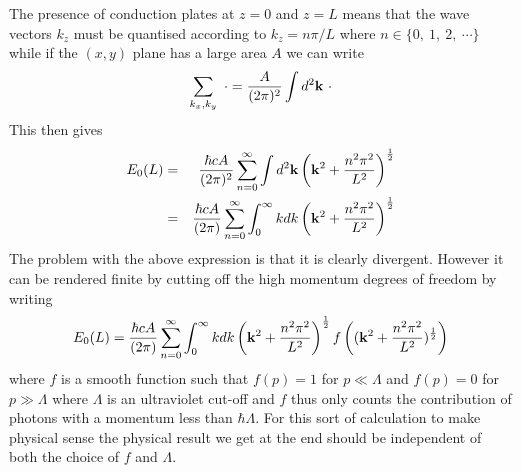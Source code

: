 The presence of conduction plates at $z=0$ and $z=L$ means that the wave vectors $k_z$
must be quantised according to $k_z= n\pi/L$ where $n \in \{0,\ 1, \ 2, \ \cdots\}$ while
if the $(x,y)$ plane has a large area $A$ we can write
\begin{equation}
    \sum_{k_x,k_y}\ \cdot= {A\over (2\pi)^2}\int  d^2{\bf k} \ \cdot
\end{equation}
This then gives 
\begin{eqnarray}
E_0(L) &=& {\hbar c A\over (2\pi)^2}\sum_{n=0}^\infty  \int  d^2{\bf k} \left({\bf k}^2 + {n^2\pi^2\over L^2}\right)^{1\over 2} \\
&=& {\hbar c A\over (2\pi)}\sum_{n=0}^\infty  \int_0^\infty  kdk \left({\bf k}^2 + {n^2\pi^2\over L^2}\right)^{1\over 2}
\end{eqnarray}
The problem with the above expression is that it is clearly divergent. However it can be rendered finite by cutting off the high momentum degrees of freedom by writing
\begin{equation}
    E_0(L) = {\hbar c A\over (2\pi)}\sum_{n=0}^\infty  \int_0^\infty  kdk \left({\bf k}^2 + {n^2\pi^2\over L^2}\right)^{1\over 2} f\left(({\bf k}^2 + {n^2\pi^2\over L^2})^{1\over 2}\right)
\end{equation}
where $f$ is a smooth function such that $f(p)=1$ for $p\ll\Lambda$ and $f(p)=0$ for $p\gg\Lambda$ where $\Lambda$ is an ultraviolet cut-off and $f$ thus only counts the contribution of photons with a momentum less than $\hbar\Lambda$. For this sort of calculation to make physical sense the physical result we get at the end should be independent of both the choice of $f$ and $\Lambda$. 




